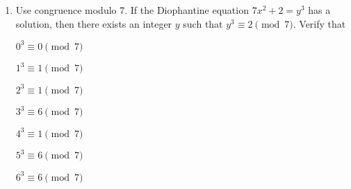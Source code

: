 \begin{enumerate}
\item Use congruence modulo 7.  If the Diophantine equation $7x^2 + 2 = y^3$ has a solution, then there exists an integer $y$ such that $y^3 \equiv 2 \pmod 7$.  Verify that
\begin{multicols}{3}
$0^3 \equiv 0 \pmod 7$

$1^3 \equiv 1 \pmod 7$

$2^3 \equiv 1 \pmod 7$

$3^3 \equiv 6 \pmod 7$

$4^3 \equiv 1 \pmod 7$

$5^3 \equiv 6 \pmod 7$

$6^3 \equiv 6 \pmod 7$
\end{multicols}
\end{enumerate}
\hbreak

\endinput
